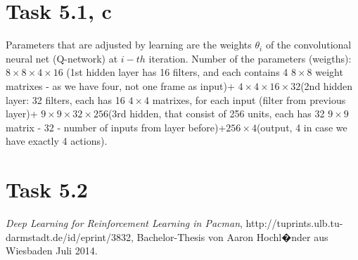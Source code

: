 \documentclass[english]{scrartcl}
\begin{document}
\section*{Task 5.1, c}
Parameters that are adjusted by learning are the weights $\theta_{i}$ of the convolutional neural net (Q-network) at $i-th$ iteration. Number of the parameters (weigths): $8\times 8\times 4 \times 16$ (1st hidden layer has 16 filters, and each contains 4 $8\times 8$ weight matrixes - as we have four, not one frame as input)+ $4\times 4\times 16 \times 32$(2nd hidden layer: 32 filters, each has 16 $4\times 4$ matrixes, for each input (filter from previous layer)+ $9\times 9\times 32\times 256$(3rd hidden, that consist of 256 units, each has 32 $9\times 9$ matrix - 32 - number of inputs from layer before)+$256\times 4$(output, 4 in case we have exactly 4 actions).
\section*{Task 5.2}
\cite{deep-learning}

\begin{thebibliography}{9}

  \emph{Deep Learning for Reinforcement Learning in Pacman},
   http://tuprints.ulb.tu-darmstadt.de/id/eprint/3832,
  Bachelor-Thesis von Aaron Hochl�nder aus Wiesbaden
  Juli 2014.

\end{thebibliography}
\end{document}
